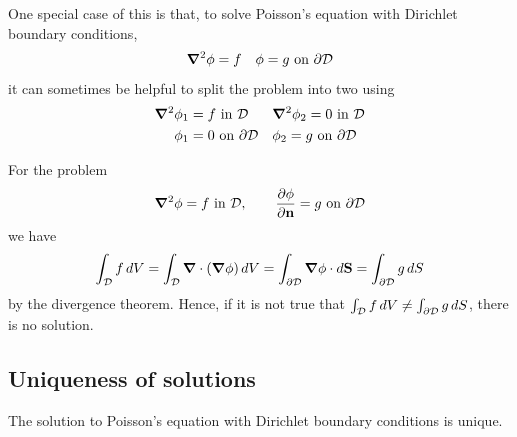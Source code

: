 \documentclass{../template/note}
\begin{document}
    One special case of this is that, to solve Poisson's equation with Dirichlet boundary conditions,
    \begin{align*}
        \grad^2\phi = f && \phi = g \text{ on } \pr \mc D
    \end{align*}
    it can sometimes be helpful to split the problem into two using
    \begin{align*}
        \grad^2\phi_1 &= f \text{ in } \mc D && \grad^2\phi_2 = 0 \text{ in } \mc D \\
        \phi_1 &= 0 \text{ on } \pr \mc D && \phi_2 = g \text{ on } \pr \mc D
    \end{align*}
    

    \begin{remark*}
        For the problem
        \begin{align*}
            \grad^2 \phi = f \text{ in } \mc D, \qquad \pd{\phi}{\V n} = g \text{ on } \pr \mc D
        \end{align*}
        we have
        \begin{align*}
            \int_{\mc D} f \D V = \int_{\mc D} \div(\grad \phi) \D V = \int_{\pr \mc D} \grad \phi \cdot d\V S = \int_{\pr \mc D} g \D S
        \end{align*}
        by the divergence theorem. Hence, if it is not true that \(\int_{\mathcal{D}} f \,d{V} \neq \int_{\partial \mathcal{D}} g \,d{S}\), there is no solution.       
    \end{remark*}
    
    \subsection{Uniqueness of solutions}

    \begin{proposition*}
        The solution to Poisson's equation with Dirichlet boundary conditions is unique.
    \end{proposition*}
    
\end{document}
